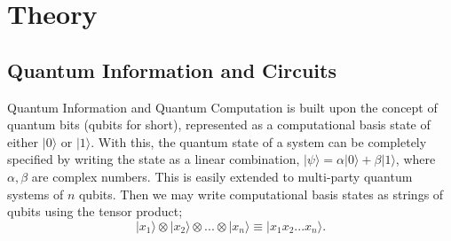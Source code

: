 \section{Theory}
\subsection{Quantum Information and Circuits}
\vspace{-0.15in}
Quantum Information and Quantum Computation is built upon the concept of quantum bits (qubits for short),
represented as a computational basis state of either $|0\rangle$ or $|1\rangle$. With this, the
quantum state of a system can be completely specified by writing the state as a linear combination,
$|\psi\rangle = \alpha |0\rangle + \beta |1\rangle$, where $\alpha, \beta$ are complex numbers.
This is easily extended to multi-party quantum systems of $n$ qubits. Then we may write computational
basis states as strings of qubits using the tensor product;
\[|x_1\rangle \otimes |x_2\rangle \otimes ... \otimes |x_n\rangle \equiv |x_1 x_2... x_n \rangle. \]

